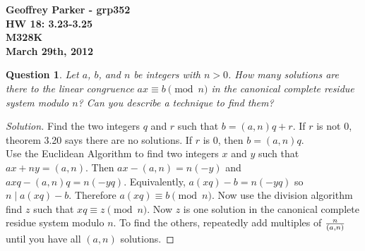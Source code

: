\documentclass[12pt,leqno]{article}
\numberwithin{equation}{section}
\newtheorem{ques}[thm]{Question}
\theoremstyle{definition}
\begin{document}
\thispagestyle{plain}
\begin{flushright}
\large{\textbf{Geoffrey Parker - grp352 \\
HW 18: 3.23-3.25\\
M328K \\
March 29th, 2012 \\}}
\end{flushright}

\markboth{}{} \setcounter{section}{0} \baselineskip=18pt

\setcounter{tocdepth}{4}



\setcounter{section}{3}

\setcounter{thm}{22}

\begin{ques}
Let $a$, $b$, and $n$ be integers with $n > 0$.  How many solutions
are there to the linear congruence $ax \equiv b \pmod{n}$ in the
canonical complete residue system modulo $n$? Can you describe a
technique to find them?
\end{ques}

\begin{proof}[Solution]
Find the two integers $q$ and $r$ such that $b = (a, n)q + r$.  If $r$ is not 0, theorem 3.20 says there are no solutions.  If $r$ is 0, then $b = (a, n)q$.\\

Use the Euclidean Algorithm to find two integers $x$ and $y$ such that $ax + ny = (a, n)$.  Then $ax - (a, n) = n(-y)$ and $axq - (a, n)q = n(-yq)$. Equivalently, $a(xq) - b = n(-yq)$ so $n \mid a(xq) - b$.  Therefore $a(xq) \equiv b \pmod{n}$.  Now use the division algorithm find $z$ such that $xq \equiv z \pmod{n}$.  Now $z$ is one solution in the canonical complete residue system modulo $n$.  To find the others, repeatedly add multiples of $n \over (a, n)$ until you have all $(a, n)$ solutions.
\end{proof}
\end{document}
